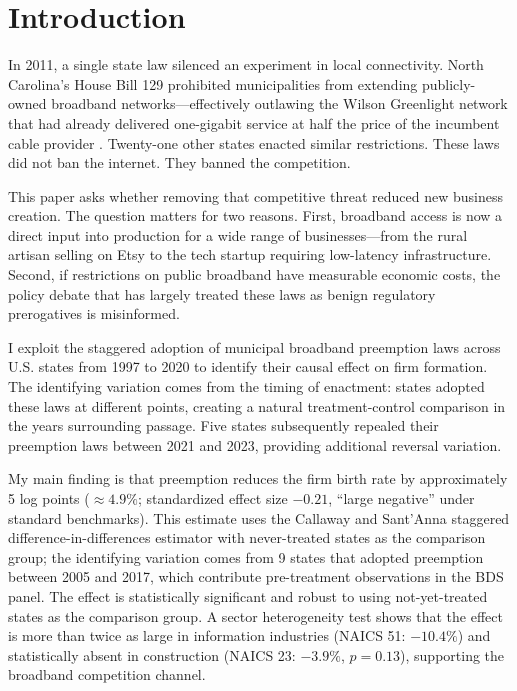 \documentclass[12pt]{article}
\begin{document}
\section{Introduction}

In 2011, a single state law silenced an experiment in local connectivity. North Carolina's House Bill 129 prohibited municipalities from extending publicly-owned broadband networks---effectively outlawing the Wilson Greenlight network that had already delivered one-gigabit service at half the price of the incumbent cable provider \citep{mitchell2012}. Twenty-one other states enacted similar restrictions. These laws did not ban the internet. They banned the competition.

This paper asks whether removing that competitive threat reduced new business creation. The question matters for two reasons. First, broadband access is now a direct input into production for a wide range of businesses---from the rural artisan selling on Etsy to the tech startup requiring low-latency infrastructure. Second, if restrictions on public broadband have measurable economic costs, the policy debate that has largely treated these laws as benign regulatory prerogatives is misinformed.

I exploit the staggered adoption of municipal broadband preemption laws across U.S. states from 1997 to 2020 to identify their causal effect on firm formation. The identifying variation comes from the timing of enactment: states adopted these laws at different points, creating a natural treatment-control comparison in the years surrounding passage. Five states subsequently repealed their preemption laws between 2021 and 2023, providing additional reversal variation.

My main finding is that preemption reduces the firm birth rate by approximately 5 log points ($\approx 4.9\%$; standardized effect size $-0.21$, ``large negative'' under standard benchmarks). This estimate uses the Callaway and Sant'Anna \citeyearpar{callaway2021difference} staggered difference-in-differences estimator with never-treated states as the comparison group; the identifying variation comes from 9 states that adopted preemption between 2005 and 2017, which contribute pre-treatment observations in the BDS panel. The effect is statistically significant and robust to using not-yet-treated states as the comparison group. A sector heterogeneity test shows that the effect is more than twice as large in information industries (NAICS 51: $-10.4\%$) and statistically absent in construction (NAICS 23: $-3.9\%$, $p=0.13$), supporting the broadband competition channel.
\end{document}
